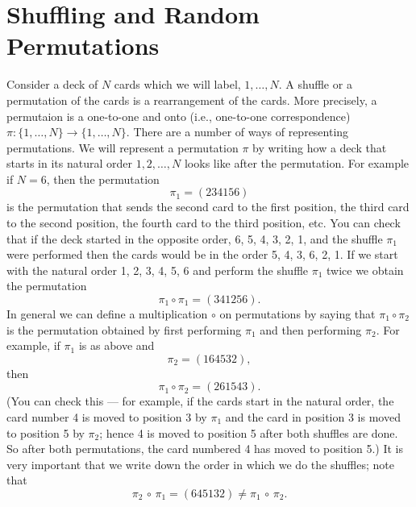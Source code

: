\documentclass{stml-l}
\theoremstyle{definition}
\numberwithin{equation}{chapter}
\numberwithin{figure}{chapter}
\numberwithin{figure}{section}
\begin{document}
\chapter{Shuffling and Random Permutations\label{ch05:chap05}}

Consider a deck of $N$ cards which we will label, $1,\ldots,N$. A
shuffle or a permutation of the cards is a rearrangement of the
cards. More precisely, a permutaion is a one-to-one and onto (i.e.,
one-to-one correspondence) $\pi
:\{1,\ldots,N\}\rightarrow\{1,\ldots,N\}$. There are a number of
ways of representing permutations. We will represent a permutation
$\pi$ by writing how a deck that starts in its natural order
$1,2,\ldots,N$ looks like after the permutation. For example if
$N=6$, then the permutation
\begin{equation*}
\pi_{1}=(234156)
\end{equation*}
is the permutation that sends the second card to the first position, the third card to the second position, the fourth card to the third position, etc. You can check that if the deck started in the opposite order, 6, 5, 4, 3, 2, 1, and the shuffle $\pi_{1}$ were performed then the cards would be in the order 5, 4, 3, 6, 2, 1. If we start with the natural order 1, 2, 3, 4, 5, 6 and perform the shuffle $\pi_{1}$ twice we obtain the permutation
\begin{equation*}
\pi_{1}\circ \pi_{1}=(341256).
\end{equation*}
In general we can define a multiplication $\circ$ on permutations by saying that $\pi_{1}\circ \pi_{2}$ is the permutation obtained by first performing $\pi_{1}$ and then performing $\pi_{2}$. For example, if $\pi_{1}$ is as above and
\begin{equation*}
\pi_{2}=(164532),
\end{equation*}
then
\begin{equation*}
\pi_{1}\circ \pi_{2}=(261543).
\end{equation*}
(You can check this --- for example, if the cards start in the natural order, the card number 4 is moved to position 3 by $\pi_{1}$ and the card in position 3 is moved to position 5 by $\pi_{2}$; hence 4 is moved to position 5 after both shuffles are done. So after both permutations, the card numbered 4 has moved to position 5.) It is very important that we write down the order in which we do the shuffles; note that
\begin{equation*}
\pi_{2}\,\circ\,\pi_{1}=(645132)\neq\pi_{1}\,\circ\,\pi_{2}.
\end{equation*}
\end{document}
